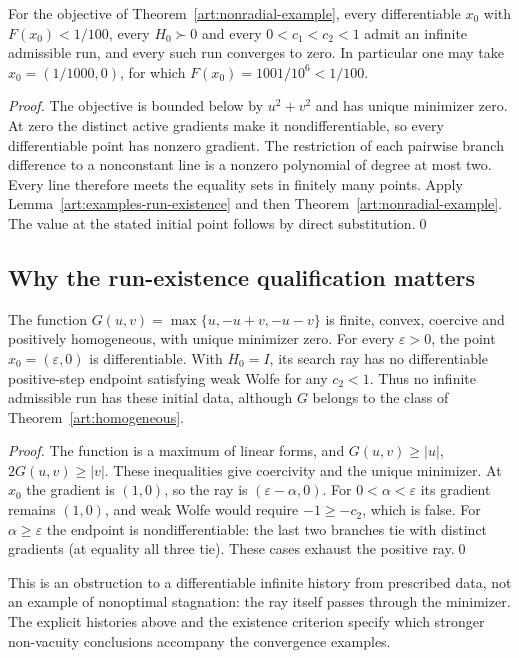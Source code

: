 \begin{corollary}\label{art:examples-nonradial-runs}
For the objective of Theorem~\ref{art:nonradial-example}, every differentiable
$x_0$ with $F(x_0)<1/100$, every $H_0\succ0$ and every $0<c_1<c_2<1$
admit an infinite admissible run, and every such run converges to zero.
In particular one may take $x_0=(1/1000,0)$, for which
$F(x_0)=1001/10^6<1/100$.
\end{corollary}
\begin{proof}
The objective is bounded below by $u^2+v^2$ and has unique minimizer zero.
At zero the distinct active gradients make it nondifferentiable, so every
differentiable point has nonzero gradient. The restriction of each pairwise
branch difference to a nonconstant line is a nonzero polynomial of degree
at most two. Every line therefore meets the equality sets in finitely many
points. Apply
Lemma~\ref{art:examples-run-existence} and then
Theorem~\ref{art:nonradial-example}. The value at the stated initial point
follows by direct substitution.\qed
\end{proof}

\subsection{Why the run-existence qualification matters}

\begin{proposition}\label{art:examples-no-step}
The function $G(u,v)=\max\{u,-u+v,-u-v\}$ is finite, convex, coercive and
positively homogeneous, with unique minimizer zero. For every $\varepsilon>0$,
the point $x_0=(\varepsilon,0)$ is differentiable. With $H_0=I$, its search
ray has no differentiable positive-step endpoint satisfying weak Wolfe for
any $c_2<1$. Thus no infinite admissible run has these initial data, although
$G$ belongs to the class of Theorem~\ref{art:homogeneous}.
\end{proposition}
\begin{proof}
The function is a maximum of linear forms, and
$G(u,v)\ge|u|$, $2G(u,v)\ge|v|$. These inequalities give coercivity and
the unique minimizer. At $x_0$ the gradient is $(1,0)$, so the ray is
$(\varepsilon-\alpha,0)$. For $0<\alpha<\varepsilon$ its gradient remains
$(1,0)$, and weak Wolfe would require $-1\ge-c_2$, which is false.
For $\alpha\ge\varepsilon$ the endpoint is nondifferentiable: the last
two branches tie with distinct gradients (at equality all three tie).
These cases exhaust the positive ray.\qed
\end{proof}

This is an obstruction to a differentiable infinite history from prescribed
data, not an example of nonoptimal stagnation: the ray itself passes through
the minimizer. The explicit histories above and the existence criterion
specify which stronger non-vacuity conclusions accompany the convergence
examples.
